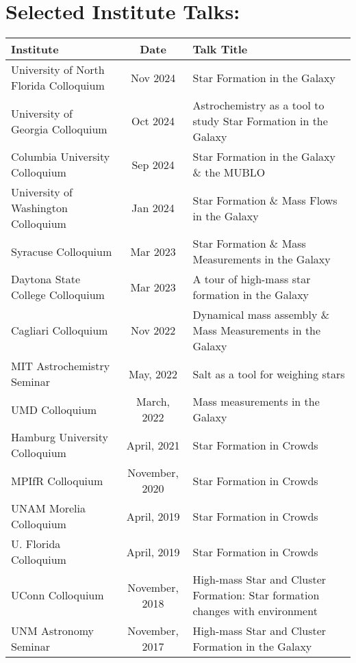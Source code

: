 
\begin{minipage}{\textwidth}
\setlength{\extrarowheight}{4pt}
\section*{Selected Institute Talks:}
\vspace{-12pt}
\begin{tabular}{p{1.8in}cp{3.5in}}
    Institute & Date & Talk Title \\
                \hline
    University of North Florida Colloquium & Nov 2024 & Star Formation in the Galaxy \\
    University of Georgia Colloquium & Oct 2024 & Astrochemistry as a tool to study Star Formation in the Galaxy \\
    Columbia University Colloquium & Sep 2024 & Star Formation in the Galaxy \& the MUBLO \\
    University of Washington Colloquium & Jan 2024 & Star Formation \& Mass Flows in the Galaxy \\
    Syracuse Colloquium & Mar 2023 & Star Formation \& Mass Measurements in the Galaxy \\
    Daytona State College Colloquium & Mar 2023 & A tour of high-mass star formation in the Galaxy \\
    Cagliari Colloquium & Nov 2022 & Dynamical mass assembly \& Mass Measurements in the Galaxy \\
    MIT Astrochemistry Seminar & May, 2022 & Salt as a tool for weighing stars \\
    UMD Colloquium & March, 2022 & Mass measurements in the Galaxy \\
    Hamburg University Colloquium & April, 2021 & Star Formation in Crowds \\
    MPIfR Colloquium & November, 2020 & Star Formation in Crowds \\
    UNAM Morelia Colloquium & April, 2019 & Star Formation in Crowds \\
    U. Florida Colloquium & April, 2019 & Star Formation in Crowds \\
    UConn Colloquium & November, 2018 & High-mass Star and Cluster Formation: Star formation changes with environment \\
    UNM Astronomy Seminar & November, 2017 & High-mass Star and Cluster Formation in the Galaxy \\

\end{tabular}
\end{minipage}
